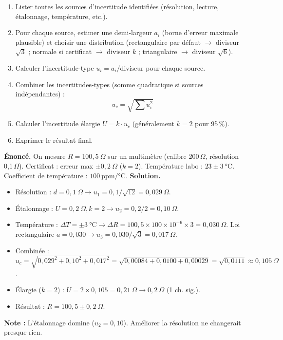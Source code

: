 \documentclass[11pt]{article}
\begin{document}
\begin{methode}
\begin{enumerate}
\item Lister toutes les sources d'incertitude identifiées (résolution, lecture, étalonnage, température, etc.).
\item Pour chaque source, estimer une demi-largeur $a_i$ (borne d'erreur maximale plausible) et choisir une distribution (rectangulaire par défaut $\to$ diviseur $\sqrt{3}$ ; normale si certificat $\to$ diviseur $k$ ; triangulaire $\to$ diviseur $\sqrt{6}$).
\item Calculer l'incertitude-type $u_i = a_i / \text{diviseur}$ pour chaque source.
\item Combiner les incertitudes-types (somme quadratique si sources indépendantes) :
\[
u_c = \sqrt{\sum u_i^2}
\]
\item Calculer l'incertitude élargie $U = k \cdot u_c$ (généralement $k=2$ pour 95\,\%).
\item Exprimer le résultat final.
\end{enumerate}
\end{methode}

\begin{exoresolu}
\textbf{Énoncé.} On mesure $R = 100,5\ \Omega$ sur un multimètre (calibre 200\,$\Omega$, résolution 0,1\,$\Omega$). Certificat : erreur max $\pm 0,2\ \Omega$ ($k=2$). Température labo : $23 \pm 3\ \mathrm{°C}$. Coefficient de température : $100\ \mathrm{ppm/°C}$.
\textbf{Solution.}
\begin{itemize}
\item Résolution : $d=0,1\ \Omega \to u_1 = 0,1/\sqrt{12} = 0,029\ \Omega$.
\item Étalonnage : $U=0,2\ \Omega, k=2 \to u_2 = 0,2/2 = 0,10\ \Omega$.
\item Température : $\Delta T = \pm 3\ \mathrm{°C} \to \Delta R = 100,5 \times 100\times10^{-6} \times 3 = 0,030\ \Omega$. Loi rectangulaire $a=0,030 \to u_3 = 0,030/\sqrt{3} = 0,017\ \Omega$.
\item Combinée : $u_c = \sqrt{0,029^2 + 0,10^2 + 0,017^2} = \sqrt{0,00084 + 0,0100 + 0,00029} = \sqrt{0,0111} \approx 0,105\ \Omega$.
\item Élargie ($k=2$) : $U = 2 \times 0,105 = 0,21\ \Omega \to 0,2\ \Omega$ (1 ch. sig.).
\item Résultat : $\boxed{R = 100,5 \pm 0,2\ \Omega}$.
\end{itemize}
\textbf{Note :} L'étalonnage domine ($u_2=0,10$). Améliorer la résolution ne changerait presque rien.
\end{exoresolu}
\end{document}
